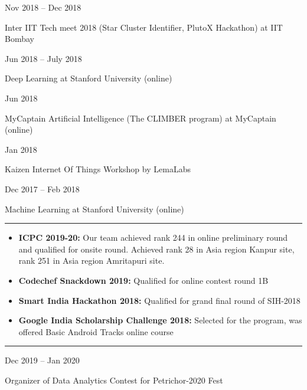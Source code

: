 \documentclass[a4paper,10pt]{article}
\newlength{\cvcolumngapwidth}
\newlength{\cvleftcolumnwidth}
\newlength{\cvrightcolumnwidth}
\newcommand{\cvsectionstyle}[1]{{\normalsize\cvsectionfont\textcolor{cvsectioncolor}{#1}}}
\newcommand{\cvtitlestyle}[1]{{\large\cvtitlefont\textcolor{cvtitlecolor}{#1}}}
\newcommand{\cvdurationstyle}[1]{{\small\cvdurationfont\textcolor{cvdurationcolor}{#1}}}
\newcommand{\cvheadingstyle}[1]{{\normalsize\cvheadingfont\textcolor{cvheadingcolor}{#1}}}
\newlength{\cvafteritemskipamount}
\newlength{\cvaftersectionskipamount}
\newlength{\cvbetweensectionandheadingextraskipamount}
\newlength{\cvaftertitleskipamount}
\newlength{\cvparskip}
\newcommand{\cvsection}[1]{
    \begin{minipage}[t]{\cvleftcolumnwidth}
        \raggedleft\cvsectionstyle{#1}
    \end{minipage}%
    \hspace{\cvcolumngapwidth}%
    \begin{minipage}[t]{\cvrightcolumnwidth}
        \textcolor{cvrulecolor}{\rule{\cvrightcolumnwidth}{0.3mm}}
    \end{minipage}

    \vspace{\cvaftersectionskipamount}
}
\newcommand{\cvitem}[2]{
    \begin{minipage}[t]{\cvleftcolumnwidth}
        \raggedleft #1
    \end{minipage}%
    \hspace{\cvcolumngapwidth}%
    \begin{minipage}[t]{\cvrightcolumnwidth}
        \setlength{\parskip}{\cvparskip} #2
    \end{minipage}

    \vspace{\cvafteritemskipamount}
}
\newcommand{\cvtitle}[1]{
    \cvtitlestyle{#1}

    \vspace{\cvaftertitleskipamount}
    \vspace{-\cvparskip}
}
\begin{document}
\vspace{\cvbetweensectionandheadingextraskipamount}

\cvitem{
    \cvdurationstyle{Nov 2018 -- Dec 2018}
}{
    \cvtitle{Inter IIT Tech meet 2018 (Star Cluster Identifier, PlutoX Hackathon) at IIT Bombay}
}

\cvitem{
    \cvdurationstyle{Jun 2018 -- July 2018}
}{
    \cvtitle{Deep Learning at Stanford University (online)}
}

\cvitem{
    \cvdurationstyle{Jun 2018}
}{
    \cvtitle{MyCaptain Artificial Intelligence (The CLIMBER program) at MyCaptain (online)}
}

\cvitem{
    \cvdurationstyle{Jan 2018}
}{
    \cvtitle{Kaizen Internet Of Things Workshop by LemaLabs}
}

\cvitem{
    \cvdurationstyle{Dec 2017 -- Feb 2018}
}{
    \cvtitle{Machine Learning at Stanford University (online)}
}



\cvsection{ACHIEVEMENTS}

\vspace{\cvbetweensectionandheadingextraskipamount}

\cvitem{
    \cvheadingstyle{}
}{
    
    \begin{itemize}
        \item \textbf{ICPC 2019-20:} Our team achieved rank 244 in online preliminary round and qualified for onsite round. Achieved rank 28 in Asia region Kanpur site, rank 251 in Asia region Amritapuri site.
        \item \textbf{Codechef Snackdown 2019:} Qualified for online contest round 1B
        \item \textbf{Smart India Hackathon 2018:} Qualified for grand final round of SIH-2018
        \item \textbf{Google India Scholarship Challenge 2018:} Selected for the program, was offered Basic Android Tracks online course
        
    \end{itemize}

    
}

\cvsection{POSITION OF RESPONSIBILITIES}

\vspace{\cvbetweensectionandheadingextraskipamount}

\cvitem{
    \cvdurationstyle{Dec 2019 -- Jan 2020}
}{
    \cvtitle{Organizer of Data Analytics Contest for Petrichor-2020 Fest}
}
\end{document}

